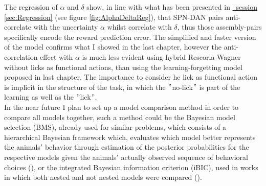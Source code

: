 The regression of $\alpha$ and $\delta$ show, in line with what has been presented in \hyperref[sec:Regression]{~session \ref*{sec:Regression}} (see figure \ref{fig:AlphaDeltaReg}), that SPN-DAN pairs anti-correlate with the uncertainty $\alpha$ whilst correlate with $\delta$, thus those assembly-pairs specifically encode the reward prediction error. The simplified and faster version of the model confirms what I showed in the last chapter, however the anti-correlation effect with $\alpha$ is much less evident using hybrid Rescorla-Wagner without licks as functional actions, than using the learning-forgetting model proposed in last chapter. The importance to consider he lick as functional action is implicit in the structure of the task, in which the $"$no-lick$"$ is part of the learning as well as the $"$lick$"$.\\In the near future I plan to set up a model comparison method in order to compare all models together, such a method could be the Bayesian model selection (BMS), already used for similar problems, which consists of a hierarchical Bayesian framework which, evaluates which model better represents the animals$'$ behavior through estimation of the posterior probabilities for the respective models given the animals$'$ actually observed sequence of behavioral choices (\cite{Koppe}), or the integrated Bayesian information criterion (iBIC), used in works in which both nested and not nested models were compared (\cite{Dayan}).